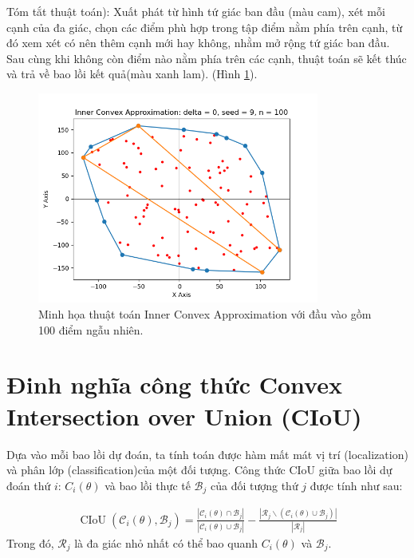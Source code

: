 \documentclass[12pt,a4paper,openany,oneside]{report}
\begin{document}
Tóm tắt thuật toán): Xuất phát từ hình tứ giác ban đầu (màu cam), xét mỗi cạnh của đa giác, chọn các điểm phù hợp trong tập điểm nằm phía trên cạnh, từ đó xem xét có nên thêm cạnh mới hay không, nhằm mở rộng tứ giác ban đầu. Sau cùng khi không còn điểm nào nằm phía trên các cạnh, thuật toán sẽ kết thúc và trả về bao lồi kết quả(màu xanh lam). (Hình \ref{inner_convex_brief}).

\begin{figure}[ht!]
	\begin{center}
		\includegraphics[width=350px]{./inner_convex_brief.png}
		\caption{Minh họa thuật toán Inner Convex Approximation với đầu vào gồm 100 điểm ngẫu nhiên.}
		\label{inner_convex_brief}
	\end{center}
\end{figure} 
\section{Đinh nghĩa công thức Convex Intersection over Union (CIoU)}
Dựa vào mỗi bao lồi dự đoán, ta tính toán được hàm mất mát vị trí (localization) và phân lớp (classification)của một đối tượng. Công thức CIoU giữa bao lồi dự đoán thứ $i$:  $C_i(\theta)$ và bao lồi thực tế $\mathcal{B}_j$ của đối tượng thứ $j$ được tính như sau:

\begin{align} \label{CioU_fomular}
	\operatorname{CIoU}\left(\mathcal{C}_i(\theta), \mathcal{B}_j\right)=\frac{\left|\mathcal{C}_i(\theta) \cap \mathcal{B}_j\right|}{\left|\mathcal{C}_i(\theta) \cup \mathcal{B}_j\right|}-\frac{\left|\mathcal{R}_j \backslash\left(\mathcal{C}_i(\theta) \cup \mathcal{B}_j\right)\right|}{\left|\mathcal{R}_j\right|}
\end{align}
Trong đó, $\mathcal{R}_j$ là đa giác nhỏ nhất có thể bao quanh  $C_i(\theta)$ và $\mathcal{B}_j$.
\end{document}
